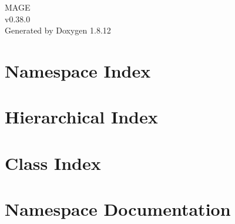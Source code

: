 \documentclass[twoside]{book}
\newcommand{\+}{\discretionary{\mbox{\scriptsize$\hookleftarrow$}}{}{}}
\newcommand{\clearemptydoublepage}{%
  \newpage{\pagestyle{empty}\cleardoublepage}%
}
\begin{document}
\hypersetup{pageanchor=false,
             bookmarksnumbered=true,
             pdfencoding=unicode
            }
\begin{titlepage}
\vspace*{7cm}
\begin{center}%
{\Large M\+A\+GE \\[1ex]\large v0.\+38.\+0 }\\
\vspace*{1cm}
{\large Generated by Doxygen 1.8.12}\\
\end{center}
\end{titlepage}
\clearemptydoublepage
{}
\tableofcontents
\clearemptydoublepage
{}
\hypersetup{pageanchor=true}

\chapter{Namespace Index}

\chapter{Hierarchical Index}

\chapter{Class Index}

\chapter{Namespace Documentation}

\end{document}
